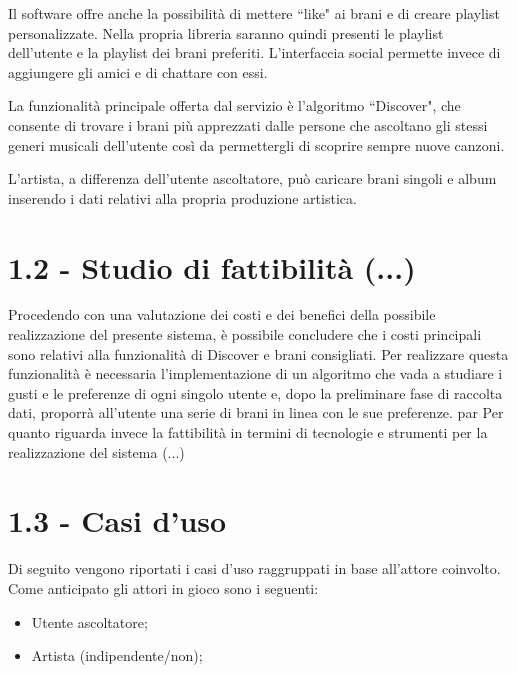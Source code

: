 \par
Il software offre anche la possibilità di mettere “like" ai brani e di creare playlist personalizzate. Nella propria libreria saranno quindi presenti le playlist dell'utente e la playlist dei brani preferiti. L'interfaccia social permette invece di aggiungere gli amici e di chattare con essi.
\par 
La funzionalità principale offerta dal servizio è l'algoritmo “Discover", che consente di trovare i brani più apprezzati dalle persone che ascoltano gli stessi generi musicali dell'utente così da permettergli di scoprire sempre nuove canzoni.
\par
L'artista, a differenza dell'utente ascoltatore, può caricare brani singoli e album inserendo i dati relativi alla propria produzione artistica. 

\vspace*{3em}

\section*{1.2 - Studio di fattibilità (...)}
Procedendo con una valutazione dei costi e dei benefici della possibile realizzazione del presente sistema, è possibile concludere che i costi principali sono relativi alla funzionalità di Discover e brani consigliati. Per realizzare questa funzionalità è necessaria l’implementazione di un algoritmo che vada a studiare i gusti e le preferenze di ogni singolo utente e, dopo la preliminare fase di raccolta dati, proporrà all’utente una serie di brani in linea con le sue preferenze. par
Per quanto riguarda invece la fattibilità in termini di tecnologie e strumenti per la realizzazione del sistema (...)

\section*{1.3 - Casi d'uso}
Di seguito vengono riportati i casi d’uso raggruppati in base all’attore coinvolto. Come anticipato gli attori in gioco sono i seguenti:
\begin{itemize}
    \item Utente ascoltatore;
    \item Artista (indipendente/non);
\end{itemize}

